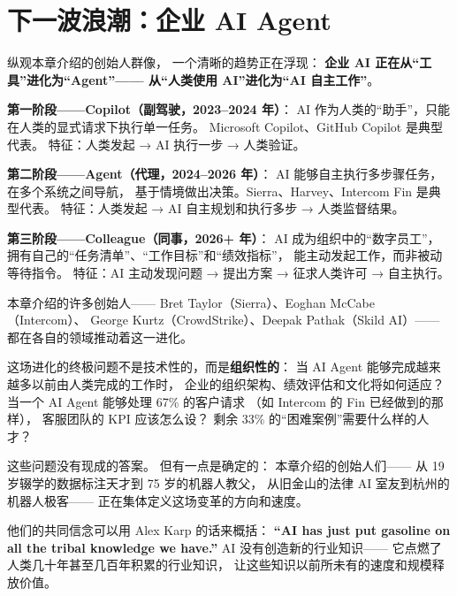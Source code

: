 \section{下一波浪潮：企业 AI Agent}
\label{sec:enterprise-agents}

纵观本章介绍的创始人群像，
一个清晰的趋势正在浮现：
\textbf{企业 AI 正在从``工具''进化为``Agent''——
从``人类使用 AI''进化为``AI 自主工作''}。

\begin{keybox}
\textbf{第一阶段——Copilot（副驾驶，2023--2024 年）}：
AI 作为人类的``助手''，只能在人类的显式请求下执行单一任务。
Microsoft Copilot、GitHub Copilot 是典型代表。
特征：人类发起 → AI 执行一步 → 人类验证。

\textbf{第二阶段——Agent（代理，2024--2026 年）}：
AI 能够自主执行多步骤任务，在多个系统之间导航，
基于情境做出决策。Sierra、Harvey、Intercom Fin 是典型代表。
特征：人类发起 → AI 自主规划和执行多步 → 人类监督结果。

\textbf{第三阶段——Colleague（同事，2026+ 年）}：
AI 成为组织中的``数字员工''，
拥有自己的``任务清单''、``工作目标''和``绩效指标''，
能主动发起工作，而非被动等待指令。
特征：AI 主动发现问题 → 提出方案 → 征求人类许可 → 自主执行。
\end{keybox}

本章介绍的许多创始人——
Bret Taylor（Sierra）、Eoghan McCabe（Intercom）、
George Kurtz（CrowdStrike）、Deepak Pathak（Skild AI）——
都在各自的领域推动着这一进化。

这场进化的终极问题不是技术性的，而是\textbf{组织性的}：
当 AI Agent 能够完成越来越多以前由人类完成的工作时，
企业的组织架构、绩效评估和文化将如何适应？
当一个 AI Agent 能够处理 67\% 的客户请求
（如 Intercom 的 Fin 已经做到的那样），
客服团队的 KPI 应该怎么设？
剩余 33\% 的``困难案例''需要什么样的人才？

这些问题没有现成的答案。
但有一点是确定的：
本章介绍的创始人们——
从 19 岁辍学的数据标注天才到 75 岁的机器人教父，
从旧金山的法律 AI 室友到杭州的机器人极客——
正在集体定义这场变革的方向和速度。

他们的共同信念可以用 Alex Karp 的话来概括：
\textbf{``AI has just put gasoline on all the tribal knowledge we have.''}
AI 没有创造新的行业知识——
它点燃了人类几十年甚至几百年积累的行业知识，
让这些知识以前所未有的速度和规模释放价值。

